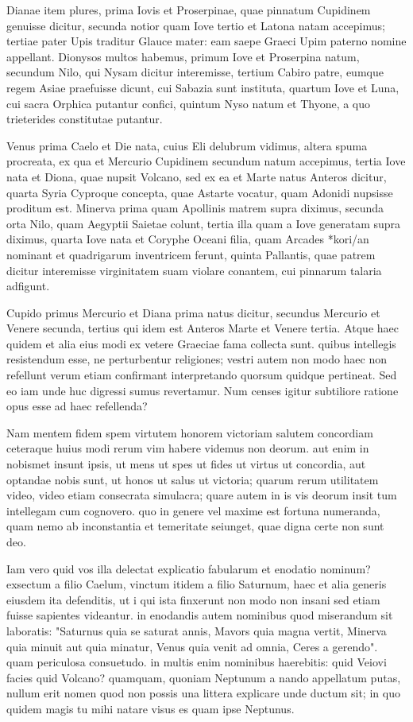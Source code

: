  Dianae item plures, prima Iovis et Proserpinae, quae pinnatum Cupidinem genuisse dicitur, secunda notior quam Iove tertio et Latona natam accepimus; tertiae pater Upis traditur Glauce mater: eam saepe Graeci Upim paterno nomine appellant. Dionysos multos habemus, primum Iove et Proserpina natum, secundum Nilo, qui Nysam dicitur interemisse, tertium Cabiro patre, eumque regem Asiae praefuisse dicunt, cui Sabazia sunt instituta, quartum Iove et Luna, cui sacra Orphica putantur confici, quintum Nyso natum et Thyone, a quo trieterides constitutae putantur.

 Venus prima Caelo et Die nata, cuius Eli delubrum vidimus, altera spuma procreata, ex qua et Mercurio Cupidinem secundum natum accepimus, tertia Iove nata et Diona, quae nupsit Volcano, sed ex ea et Marte natus Anteros dicitur, quarta Syria Cyproque concepta, quae Astarte vocatur, quam Adonidi nupsisse proditum est. Minerva prima quam Apollinis matrem supra diximus, secunda orta Nilo, quam Aegyptii Saietae colunt, tertia illa quam a Iove generatam supra diximus, quarta Iove nata et Coryphe Oceani filia, quam Arcades *kori/an nominant et quadrigarum inventricem ferunt, quinta Pallantis, quae patrem dicitur interemisse virginitatem suam violare conantem, cui pinnarum talaria adfigunt.

 Cupido primus Mercurio et Diana prima natus dicitur, secundus Mercurio et Venere secunda, tertius qui idem est Anteros Marte et Venere tertia. Atque haec quidem et alia eius modi ex vetere Graeciae fama collecta sunt. quibus intellegis resistendum esse, ne perturbentur religiones; vestri autem non modo haec non refellunt verum etiam confirmant interpretando quorsum quidque pertineat. Sed eo iam unde huc digressi sumus revertamur. Num censes igitur subtiliore ratione opus esse ad haec refellenda?

 Nam mentem fidem spem virtutem honorem victoriam salutem concordiam ceteraque huius modi rerum vim habere videmus non deorum. aut enim in nobismet insunt ipsis, ut mens ut spes ut fides ut virtus ut concordia, aut optandae nobis sunt, ut honos ut salus ut victoria; quarum rerum utilitatem video, video etiam consecrata simulacra; quare autem in is vis deorum insit tum intellegam cum cognovero. quo in genere vel maxime est fortuna numeranda, quam nemo ab inconstantia et temeritate seiunget, quae digna certe non sunt deo.

 Iam vero quid vos illa delectat explicatio fabularum et enodatio nominum? exsectum a filio Caelum, vinctum itidem a filio Saturnum, haec et alia generis eiusdem ita defenditis, ut i qui ista finxerunt non modo non insani sed etiam fuisse sapientes videantur. in enodandis autem nominibus quod miserandum sit laboratis: "Saturnus quia se saturat annis, Mavors quia magna vertit, Minerva quia minuit aut quia minatur, Venus quia venit ad omnia, Ceres a gerendo". quam periculosa consuetudo. in multis enim nominibus haerebitis: quid Veiovi facies quid Volcano? quamquam, quoniam Neptunum a nando appellatum putas, nullum erit nomen quod non possis una littera explicare unde ductum sit; in quo quidem magis tu mihi natare visus es quam ipse Neptunus.

